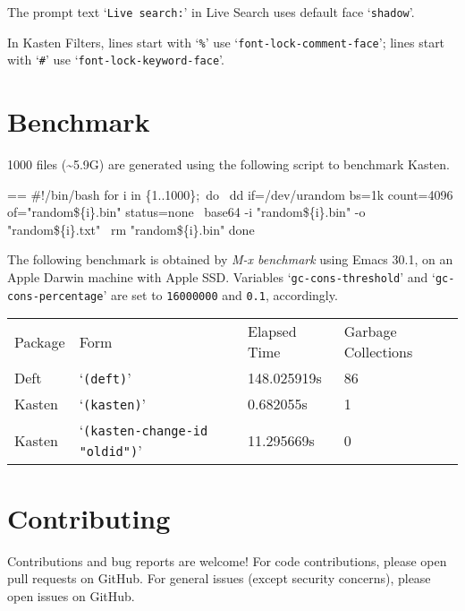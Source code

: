 \documentclass{book}
\makeatletter
\newcommand\Texinfocommandstyletextkbd[1]{{\ttfamily\textsl{#1}}}%
\newenvironment{Texinfopreformatted}{%
  \par\GNUTobeylines\obeyspaces\frenchspacing\parskip=\z@\parindent=\z@}{}
{\catcode`\^^M=13 \gdef\GNUTobeylines{\catcode`\^^M=13 \def^^M{\null\par}}}
\newenvironment{Texinfoindented}{\begin{list}{}{}\item\relax}{\end{list}}
\renewcommand{\_}{\Texinfounderscore\discretionary{}{}{}}
\makeatother
\begin{document}
The prompt text `\texttt{Live search:}' in Live Search uses default face `\texttt{shadow}'.

In Kasten Filters, lines start with `\texttt{\%}' use `\texttt{font-lock-comment-face}'; lines
start with `\texttt{\#}' use `\texttt{font-lock-keyword-face}'.

\chapter{{Benchmark}}
\label{anchor:Benchmark}%

1000 files (\~{}5.9G) are generated using the following script to benchmark Kasten.

\begin{Texinfoindented}
\begin{Texinfopreformatted}%
\ttfamily \#!/bin/bash
for i in \{1..1000\};\ do
\    dd if=/dev/urandom bs=1k count=4096 of="random\_\$\{i\}.bin" status=none
\    base64 -i "random\_\$\{i\}.bin" -o "random\_\$\{i\}.txt"
\    rm "random\_\$\{i\}.bin"
done
\end{Texinfopreformatted}
\end{Texinfoindented}

The following benchmark is obtained by \Texinfocommandstyletextkbd{M-x benchmark} using Emacs
30.1, on an Apple Darwin machine with Apple SSD\@.  Variables `\texttt{gc-cons-threshold}'
and `\texttt{gc-cons-percentage}' are set to \texttt{16000000} and \texttt{0.1}, accordingly.

\begin{tabular}{m{} m{} m{} m{}}%
Package&
Form&
Elapsed Time&
Garbage Collections\\
Deft&
`\texttt{(deft)}'&
148.025919s&
86\\
Kasten&
`\texttt{(kasten)}'&
0.682055s&
1\\
Kasten&
`\texttt{(kasten-change-id "oldid")}'&
11.295669s&
0\\
\end{tabular}%

\chapter{{Contributing}}
\label{anchor:Contributing}%

Contributions and bug reports are welcome!  For code contributions, please open
pull requests on GitHub.  For general issues (except security concerns), please
open issues on GitHub.
\end{document}

